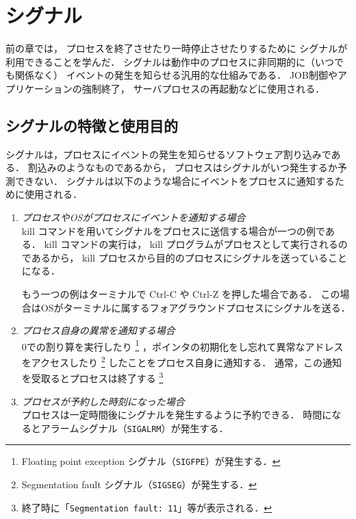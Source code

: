 \chapter{シグナル}

前の章では，
プロセスを終了させたり一時停止させたりするために
シグナルが利用できることを学んだ．
シグナルは動作中のプロセスに非同期的に（いつでも関係なく）
イベントの発生を知らせる汎用的な仕組みである．
JOB制御やアプリケーションの強制終了，
サーバプロセスの再起動などに使用される．

\section{シグナルの特徴と使用目的}
シグナルは，プロセスにイベントの発生を知らせるソフトウェア割り込みである．
割込みのようなものであるから，
プロセスはシグナルがいつ発生するか予測できない．
シグナルは以下のような場合にイベントをプロセスに通知するために使用される．

\begin{enumerate}
\item \emph{プロセスやOSがプロセスにイベントを通知する場合}\\
  kill コマンドを用いてシグナルをプロセスに送信する場合が一つの例である．
  kill コマンドの実行は，
  kill プログラムがプロセスとして実行されるのであるから，
  kill プロセスから目的のプロセスにシグナルを送っていることになる．

  もう一つの例はターミナルで Ctrl-C や Ctrl-Z を押した場合である．
  この場合はOSがターミナルに属するフォアグラウンドプロセスにシグナルを送る．

\item \emph{プロセス自身の異常を通知する場合}\\
  0での割り算を実行したり
  \footnote{Floating point exception シグナル（\texttt{SIGFPE}）が発生する．}
  ，ポインタの初期化をし忘れて異常なアドレスをアクセスしたり
  \footnote{Segmentation fault シグナル（\texttt{SIGSEG}）が発生する．}
  したことをプロセス自身に通知する．
  通常，この通知を受取るとプロセスは終了する
  \footnote{終了時に「\texttt{Segmentation fault: 11}」等が表示される．}

\item \emph{プロセスが予約した時刻になった場合}\\
  プロセスは一定時間後にシグナルを発生するように予約できる．
  時間になるとアラームシグナル（\texttt{SIGALRM}）が発生する．
\end{enumerate}

